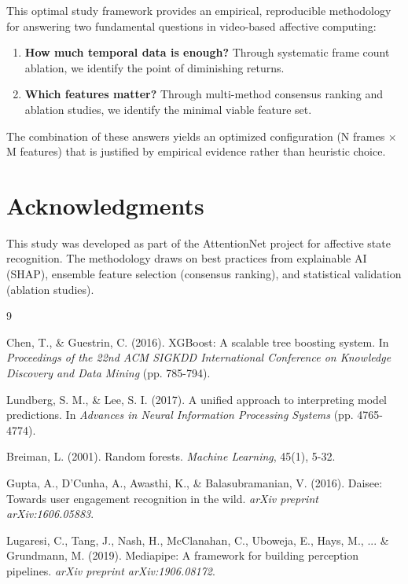 \documentclass[11pt,a4paper]{article}
\begin{document}
This optimal study framework provides an empirical, reproducible methodology for answering two fundamental questions in video-based affective computing:

\begin{enumerate}
  \item \textbf{How much temporal data is enough?} Through systematic frame count ablation, we identify the point of diminishing returns.

  \item \textbf{Which features matter?} Through multi-method consensus ranking and ablation studies, we identify the minimal viable feature set.
\end{enumerate}

The combination of these answers yields an optimized configuration (N frames $\times$ M features) that is justified by empirical evidence rather than heuristic choice.

\section*{Acknowledgments}

This study was developed as part of the AttentionNet project for affective state recognition. The methodology draws on best practices from explainable AI (SHAP), ensemble feature selection (consensus ranking), and statistical validation (ablation studies).

\begin{thebibliography}{9}

  Chen, T., \& Guestrin, C. (2016). XGBoost: A scalable tree boosting system. In \textit{Proceedings of the 22nd ACM SIGKDD International Conference on Knowledge Discovery and Data Mining} (pp. 785-794).

  Lundberg, S. M., \& Lee, S. I. (2017). A unified approach to interpreting model predictions. In \textit{Advances in Neural Information Processing Systems} (pp. 4765-4774).

  Breiman, L. (2001). Random forests. \textit{Machine Learning}, 45(1), 5-32.

  Gupta, A., D'Cunha, A., Awasthi, K., \& Balasubramanian, V. (2016). Daisee: Towards user engagement recognition in the wild. \textit{arXiv preprint arXiv:1606.05883}.

  Lugaresi, C., Tang, J., Nash, H., McClanahan, C., Uboweja, E., Hays, M., ... \& Grundmann, M. (2019). Mediapipe: A framework for building perception pipelines. \textit{arXiv preprint arXiv:1906.08172}.

\end{thebibliography}
\end{document}
